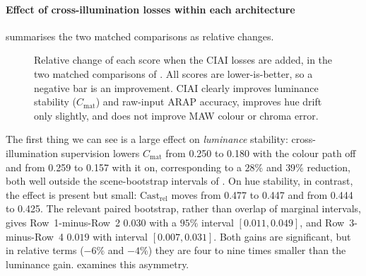\paragraph{Effect of cross-illumination losses within each architecture}
 summarises the two matched comparisons as relative changes.

\begin{figure}[t!]
  \centering
  \caption[Relative effect of CIAI in the matched ablation.]{%
    Relative change of each score when the CIAI losses are added, in the two matched
    comparisons of . All scores are lower-is-better, so a negative bar is an
    improvement. CIAI clearly improves luminance stability ($C_{\text{mat}}$) and raw-input ARAP
    accuracy, improves hue drift only slightly, and does not improve MAW colour or chroma
    error.
  }
  \label{fig:ablation_deltas}
\end{figure}

The first thing we can see is a large effect on \emph{luminance} stability: cross-illumination supervision lowers
$C_{\text{mat}}$ from 0.250 to 0.180 with the colour path off and from 0.259 to 0.157 with
it on, corresponding to a $28\%$ and $39\%$ reduction, both well outside the scene-bootstrap intervals of
. On hue stability, in contrast, the effect is present but small:
$\text{Cast}_{\text{rel}}$ moves from 0.477 to 0.447 and from 0.444 to 0.425.
The relevant paired bootstrap, rather than overlap of marginal intervals, gives
Row~1-minus-Row~2 $0.030$ with a $95\%$ interval $[0.011,0.049]$, and
Row~3-minus-Row~4 $0.019$ with interval $[0.007,0.031]$. Both gains are significant, but in
relative terms ($-6\%$ and $-4\%$) they are four to nine times smaller than the luminance gain.
 examines this asymmetry.

